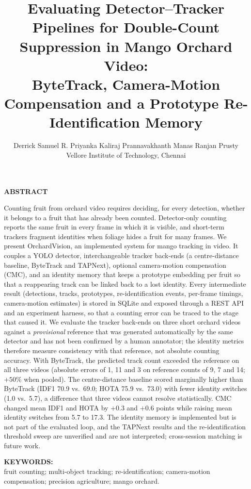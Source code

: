 \documentclass[11pt,a4paper]{article}
\title{\bfseries Evaluating Detector--Tracker Pipelines for Double-Count Suppression in Mango Orchard Video:\\
ByteTrack, Camera-Motion Compensation and a Prototype Re-Identification Memory}
\author{Derrick Samuel R. \qquad Priyanka Kaliraj \qquad Prannavakhanth \qquad Manas Ranjan Prusty \\[2pt]
Vellore Institute of Technology, Chennai}
\date{}
\renewenvironment{abstract}{%
  \noindent\textbf{ABSTRACT}\par
  \ignorespaces
}{%
  \par
}
\begin{document}
\maketitle

\begin{abstract}
Counting fruit from orchard video requires deciding, for every detection, whether it belongs to a fruit that has already been counted. Detector-only counting reports the same fruit in every frame in which it is visible, and short-term trackers fragment identities when foliage hides a fruit for many frames. We present OrchardVision, an implemented system for mango tracking in video. It couples a YOLO detector, interchangeable tracker back-ends (a centre-distance baseline, ByteTrack and TAPNext), optional camera-motion compensation (CMC), and an identity memory that keeps a prototype embedding per fruit so that a reappearing track can be linked back to a lost identity. Every intermediate result (detections, tracks, prototypes, re-identification events, per-frame timings, camera-motion estimates) is stored in SQLite and exposed through a REST API and an experiment harness, so that a counting error can be traced to the stage that caused it. We evaluate the tracker back-ends on three short orchard videos against a \emph{provisional} reference that was generated automatically by the same detector and has not been confirmed by a human annotator; the identity metrics therefore measure consistency with that reference, not absolute counting accuracy. With ByteTrack, the predicted track count exceeded the reference on all three videos (absolute errors of 1, 11 and 3 on reference counts of 9, 7 and 14; $+50\%$ when pooled). The centre-distance baseline scored marginally higher than ByteTrack (IDF1 70.9 vs.\ 69.0; HOTA 75.9 vs.\ 73.0) with fewer identity switches (1.0 vs.\ 5.7), a difference that three videos cannot resolve statistically. CMC changed mean IDF1 and HOTA by $+0.3$ and $+0.6$ points while raising mean identity switches from 5.7 to 17.3. The identity memory is implemented but is not part of the evaluated loop, and the TAPNext results and the re-identification threshold sweep are unverified and are not interpreted; cross-session matching is future work.
\end{abstract}

\noindent\textbf{KEYWORDS:}\\
fruit counting; multi-object tracking; re-identification; camera-motion compensation; precision agriculture; mango orchard.
\end{document}
